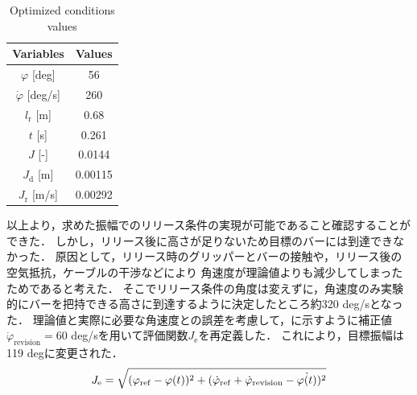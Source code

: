           \begin{table}[tb]
            \begin{center}
              \caption{Optimized conditions values}
              \vspace{2mm}
              \begin{tabular}{c|c}
                \hline
                Variables & Values \\
                \hline
                $\varphi$ [deg] & 56 \\
                $\dot{\varphi}$ [deg/s] & 260 \\
                $l_{\mathrm{r}}$ [m] & 0.68 \\
                $t$ [s] & 0.261 \\
                $J$ [-] & 0.0144 \\
                $J_{\mathrm{d}}$ [m] & 0.00115 \\
                $J_{\mathrm{r}}$ [m/s] & 0.00292 \\
                \hline
              \end{tabular}
            \end{center}
          \end{table}
          以上より，求めた振幅でのリリース条件の実現が可能であること確認することができた．
          しかし，リリース後に高さが足りないため目標のバーには到達できなかった．
          原因として，リリース時のグリッパーとバーの接触や，リリース後の空気抵抗，ケーブルの干渉などにより
          角速度が理論値よりも減少してしまったためであると考えた．
          そこでリリース条件の角度は変えずに，角速度のみ実験的にバーを把持できる高さに到達するように決定したところ約320 deg/sとなった．
          理論値と実際に必要な角速度との誤差を考慮して，に示すように補正値$\dot{\varphi}_{\mathrm{revision}} =$60 deg/sを用いて評価関数$J_{\mathrm{e}}$を再定義した．
          これにより，目標振幅は119 degに変更された．
          \begin{eqnarray}
            \equlabel{error2}
            J_{\mathrm{e}}=\sqrt{(\varphi_{\mathrm{ref}}-\varphi(t))^2+(\dot{\varphi}_{\mathrm{ref}}+\dot{\varphi}_{\mathrm{revision}}-\dot{\varphi(t)})^2}
          \end{eqnarray}
          
